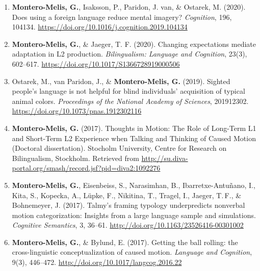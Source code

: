 \documentclass[margin, 11pt]{res} %
\begin{document}
\begin{resume}
\begin{enumerate}
	\item \textbf{Montero-Melis, G.}, Isaksson, P., Paridon, J. van, \& Ostarek, M. (2020). Does using a foreign language reduce mental imagery? \emph{Cognition}, 196, 104134. \url{https://doi.org/10.1016/j.cognition.2019.104134}

	\item \textbf{Montero-Melis, G.}, \& Jaeger, T. F. (2020). Changing expectations mediate adaptation in L2 production. \emph{Bilingualism: Language and Cognition}, 23(3), 602–617. \url{https://doi.org/10.1017/S1366728919000506}

	\item Ostarek, M., van Paridon, J., \& \textbf{Montero-Melis, G.} (2019). Sighted people’s language is not helpful for blind individuals’ acquisition of typical animal colors. \emph{Proceedings of the National Academy of Sciences}, 201912302. \url{https://doi.org/10.1073/pnas.1912302116}


	
	\item \textbf{Montero-Melis, G.} (2017). Thoughts in Motion: The Role of Long-Term L1 and Short-Term L2 Experience when Talking and Thinking of Caused Motion (Doctoral dissertation). Stocholm University, Centre for Research on Bilingualism, Stockholm. Retrieved from \url{http://su.diva-portal.org/smash/record.jsf?pid=diva2:1092276}

	\item \textbf{Montero-Melis, G.}, Eisenbeiss, S., Narasimhan, B., Ibarretxe-Antu\~{n}ano, I., Kita, S., Kopecka, A., L{\"u}pke, F., Nikitina, T., Tragel, I., Jaeger, T.\,F., \& Bohnemeyer, J. (2017). Talmy's framing typology underpredicts nonverbal motion categorization: Insights from a large language sample and simulations. \emph{Cognitive Semantics}, 3, 36--61. \url{http://doi.org/10.1163/23526416-00301002}

	\item \textbf{Montero-Melis, G.}, \& Bylund, E. (2017). Getting the ball rolling: the cross-linguistic conceptualization of caused motion. \emph{Language and Cognition}, 9(3), 446--472. \url{http://doi.org/10.1017/langcog.2016.22}


\end{enumerate}
\end{resume}
\end{document}
